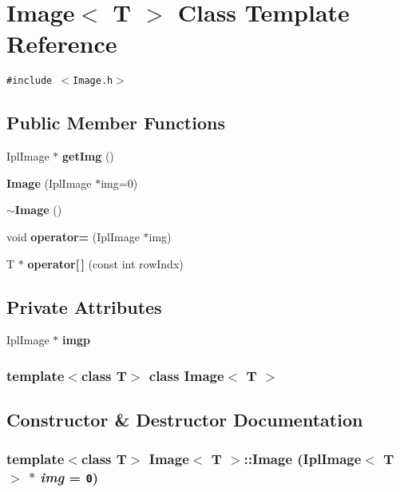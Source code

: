 \section{Image$<$ T $>$ Class Template Reference}
\label{classImage}
{\tt \#include $<$Image.h$>$}

\subsection*{Public Member Functions}
\begin{CompactItemize}
\item 
IplImage $\ast$ {\bf getImg} ()
\item 
{\bf Image} (IplImage $\ast$img=0)
\item 
{\bf $\sim$Image} ()
\item 
void {\bf operator=} (IplImage $\ast$img)
\item 
T $\ast$ {\bf operator[$\,$]} (const int rowIndx)
\end{CompactItemize}
\subsection*{Private Attributes}
\begin{CompactItemize}
\item 
IplImage $\ast$ {\bf imgp}
\end{CompactItemize}
\subsubsection*{template$<$class T$>$ class Image$<$ T $>$}



\subsection{Constructor \& Destructor Documentation}
\subsubsection{\setlength{\rightskip}{0pt plus 5cm}template$<$class T$>$ {\bf Image}$<$ T $>$::{\bf Image} (IplImage$<$ T $>$ $\ast$ {\em img} = {\tt 0})\hspace{0.3cm}{\tt  [inline]}}\label{classImage_6a042da5d014fa4082b2180bd933524b}


